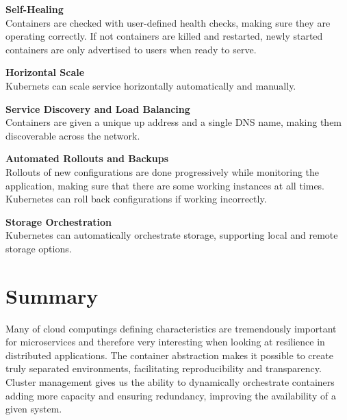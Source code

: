 \textbf{Self-Healing}\\
Containers are checked with user-defined health checks, making sure they are operating correctly. If not containers are killed and restarted, newly started containers are only advertised to users when ready to serve.

\textbf{Horizontal Scale}\\
Kubernets can scale service horizontally automatically and manually.

\textbf{Service Discovery and Load Balancing}\\
Containers are given a unique up address and a single DNS name, making them discoverable across the network.

\textbf{Automated Rollouts and Backups}\\
Rollouts of new configurations are done progressively while monitoring the application, making sure that there are some working instances at all times. Kubernetes can roll back configurations if working incorrectly.

\textbf{Storage Orchestration}\\
Kubernetes can automatically orchestrate storage, supporting local and remote storage options.


\section{Summary}
Many of cloud computings defining characteristics are tremendously important for microservices and therefore very interesting when looking at resilience in distributed applications. The container abstraction makes it possible to create truly separated environments, facilitating reproducibility and transparency. Cluster management gives us the ability to dynamically orchestrate containers adding more capacity and ensuring redundancy, improving the availability of a given system.